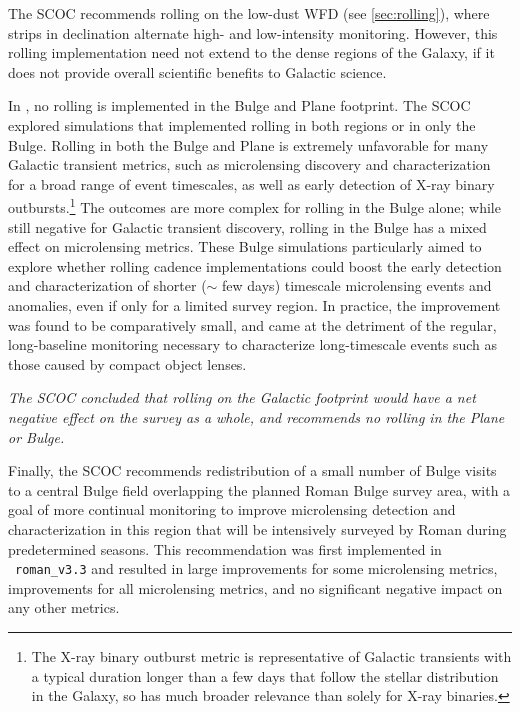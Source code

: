 The SCOC recommends rolling on the low-dust WFD (see \autoref{sec:rolling}), where strips in declination alternate high- and low-intensity monitoring. %
However, this rolling implementation need not extend to the dense regions of the Galaxy, if it does not provide overall scientific benefits to Galactic science.

In , no rolling is implemented in the Bulge and Plane footprint. The SCOC explored simulations that implemented rolling in both regions or in only the Bulge.
Rolling in both the Bulge and Plane is extremely unfavorable for many Galactic transient metrics, such as microlensing discovery and characterization for a broad range of event timescales, as well as early detection of X-ray binary outbursts.\footnote{The X-ray binary outburst metric is representative of Galactic transients with a typical duration longer than a few days that follow the stellar distribution in the Galaxy, so has much broader relevance than solely for X-ray binaries.} The outcomes are more complex for rolling in the Bulge alone; while still negative for Galactic transient discovery, rolling in the Bulge has a mixed effect on microlensing metrics. These Bulge simulations particularly aimed to explore whether rolling cadence implementations could boost the early detection and characterization of shorter ($\sim$ few days) timescale microlensing events and anomalies, even if only for a limited survey region. In practice, the improvement was found to be comparatively small, and came at the detriment of the regular, long-baseline monitoring necessary to characterize long-timescale events such as those caused by compact object lenses.   


{\it The SCOC concluded that rolling on the Galactic footprint would have a net negative effect on the survey as a whole, and recommends no rolling in the Plane or Bulge.}

Finally, the SCOC recommends redistribution of a small number of Bulge visits to 
a central Bulge field overlapping the planned Roman Bulge survey area, with a goal of more continual monitoring to improve microlensing detection and characterization in this region that will be intensively surveyed by Roman during predetermined seasons.
This recommendation was first implemented in \opsim\ \texttt{roman\_v3.3} and resulted in large improvements for some microlensing metrics, improvements for all microlensing metrics, and no significant negative impact on any other metrics. 

